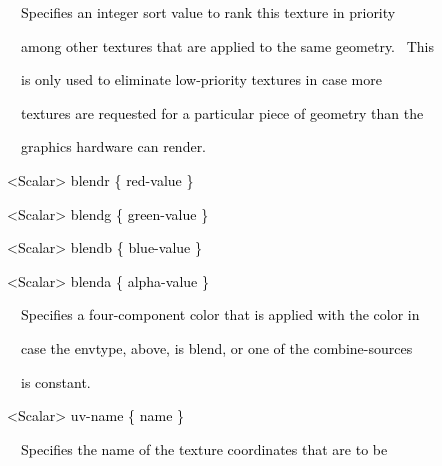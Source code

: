 \documentclass[a4paper]{article}
\newcommand\textstyleOOoComputerKeyWord[1]{\textrm{\textcolor[rgb]{0.0,0.0,0.5019608}{#1}}}
\begin{document}
{\color{black}
\textstyleOOoComputerKeyWord{\textcolor{black}{\ \ \ \ Specifies an integer sort value to rank this texture in
priority}}}

{\color{black}
\textstyleOOoComputerKeyWord{\textcolor{black}{\ \ \ \ among other textures that are applied to the same geometry.
\ This}}}

{\color{black}
\textstyleOOoComputerKeyWord{\textcolor{black}{\ \ \ \ is only used to eliminate low-priority textures in case more}}}

{\color{black}
\textstyleOOoComputerKeyWord{\textcolor{black}{\ \ \ \ textures are requested for a particular piece of geometry than
the}}}

{\color{black}
\textstyleOOoComputerKeyWord{\textcolor{black}{\ \ \ \ graphics hardware can render.}}}


\bigskip

{\color{black}
\textstyleOOoComputerKeyWord{\textcolor{black}{\ \ {\textless}Scalar{\textgreater} blendr \{ red-value \}}}}

{\color{black}
\textstyleOOoComputerKeyWord{\textcolor{black}{\ \ {\textless}Scalar{\textgreater} blendg \{ green-value \}}}}

{\color{black}
\textstyleOOoComputerKeyWord{\textcolor{black}{\ \ {\textless}Scalar{\textgreater} blendb \{ blue-value \}}}}

{\color{black}
\textstyleOOoComputerKeyWord{\textcolor{black}{\ \ {\textless}Scalar{\textgreater} blenda \{ alpha-value \}}}}


\bigskip

{\color{black}
\textstyleOOoComputerKeyWord{\textcolor{black}{\ \ \ \ Specifies a four-component color that is applied with the color
in}}}

{\color{black}
\textstyleOOoComputerKeyWord{\textcolor{black}{\ \ \ \ case the envtype, above, is {\textquotedbl}blend{\textquotedbl},
or one of the combine-sources}}}

{\color{black}
\textstyleOOoComputerKeyWord{\textcolor{black}{\ \ \ \ is {\textquotedbl}constant{\textquotedbl}.}}}


\bigskip

{\color{black}
\textstyleOOoComputerKeyWord{\textcolor{black}{\ \ {\textless}Scalar{\textgreater} uv-name \{ name \}}}}


\bigskip

{\color{black}
\textstyleOOoComputerKeyWord{\textcolor{black}{\ \ \ \ Specifies the name of the texture coordinates that are to be}}}
\end{document}
